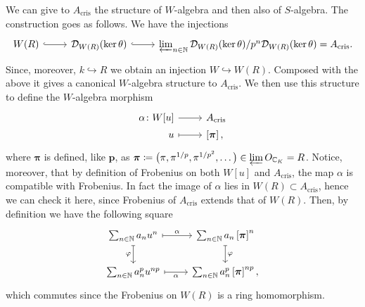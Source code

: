 \begin{rem}[]\label{AcrisAlgebraStructures}
	We can give to $A_{\mathrm{cris}}$ the structure of $W$-algebra and then also
	of $S$-algebra.
	The construction goes as follows.
	We have the injections
	\begin{equation*}
	\begin{tikzcd}
		W(R) \arrow[r, "", hookrightarrow] &
		\mathcal{D}_{W(R)}(\ker\theta) \arrow[r, "", hookrightarrow] &
		\varprojlim_{n \in \mathbb{N}} \mathcal{D}_{W(R)}(\ker\theta)/
		p^n \mathcal{D}_{W(R)}(\ker\theta) = A_{\mathrm{cris}}
	.\end{tikzcd}
	\end{equation*}
	Since, moreover, $k \hookrightarrow R$ we obtain an injection $W \hookrightarrow W(R)$.
	Composed with the above it gives a canonical $W$-algebra structure to $A_{\mathrm{cris}}$.
	We then use this structure to define the $W$-algebra morphism
	\begin{equation*}
	\begin{tikzcd}[row sep = 0ex
		,/tikz/column 1/.append style={anchor=base east}
		,/tikz/column 2/.append style={anchor=base west}]
		\alpha\colon W[u] \arrow[r, "", rightarrow] &
		A_{\mathrm{cris}} \\
		u \arrow[r, "", mapsto] & \left[ \boldsymbol\pi \right]
	,\end{tikzcd}
	\end{equation*}
	where $\boldsymbol\pi$ is defined, like $\mathbf{p}$, as
	$\boldsymbol\pi \coloneqq \big( \pi, \pi^{1/p}, \pi^{1/p^2}, \ldots \big)
	\in \varprojlim O_{\mathbb{C}_K} = R$.
	Notice, moreover, that by definition of Frobenius on both $W[u]$ and
	$A_{\mathrm{cris}}$, the map $\alpha$ is compatible with Frobenius.
	In fact the image of $\alpha$ lies in $W(R) \subset A_{\mathrm{cris}}$, hence we can check it
	here, since Frobenius of $A_{\mathrm{cris}}$ extends that of $W(R)$.
	Then, by definition we have the following square
	\begin{equation*}
	\begin{tikzcd}
		\sum_{n \in \mathbb{N} }^{  } a_n u^n
		\arrow[r, "\alpha", mapsto] \arrow[d, "\varphi"', mapsto] &
		\sum_{n \in \mathbb{N} }^{  } a_n \left[ \boldsymbol\pi \right]^n
		\arrow[d, "\varphi", mapsto] \\
		\sum_{n \in \mathbb{N} }^{  } a_n^p u^{np}
		\arrow[r, "\alpha"', mapsto] &
		\sum_{n \in \mathbb{N} }^{  } a_n^p \left[ \boldsymbol\pi \right]^{np}
	,\end{tikzcd}
	\end{equation*}
	which commutes since the Frobenius on $W(R)$ is a ring homomorphism.

\end{rem}
